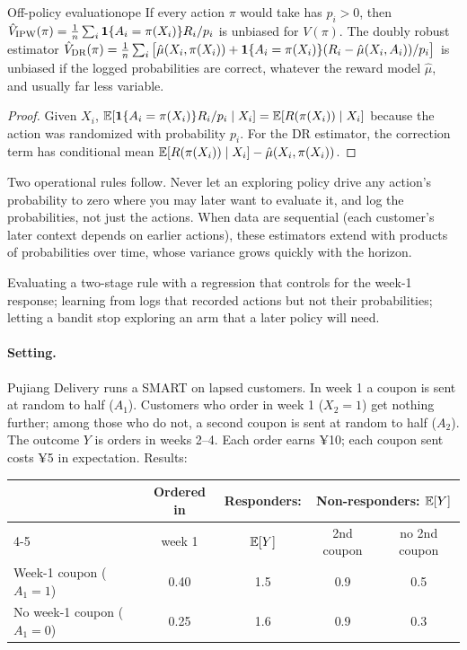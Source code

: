 \documentclass[11pt]{article}
\begin{document}
\begin{prop}{Off-policy evaluation}{ope}
If every action $\pi$ would take has $p_i > 0$, then $\hat V_{\text{IPW}}(\pi) = \frac1n\sum_i \mathbf{1}\{A_i = \pi(X_i)\}R_i/p_i$ is unbiased for
$V(\pi)$. The doubly robust estimator
$\hat V_{\text{DR}}(\pi) = \frac1n\sum_i\big[\hat\mu(X_i, \pi(X_i)) + \mathbf{1}\{A_i = \pi(X_i)\}(R_i - \hat\mu(X_i, A_i))/p_i\big]$ is unbiased if the logged
probabilities are correct, whatever the reward model $\hat\mu$, and usually far less variable.
\end{prop}
\begin{proof}
Given $X_i$, $\mathbb{E}[\mathbf{1}\{A_i = \pi(X_i)\}R_i/p_i \mid X_i] = \mathbb{E}[R(\pi(X_i)) \mid X_i]$ because the action was randomized with probability
$p_i$. For the DR estimator, the correction term has conditional mean $\mathbb{E}[R(\pi(X_i)) \mid X_i] - \hat\mu(X_i, \pi(X_i))$.
\end{proof}

Two operational rules follow. Never let an exploring policy drive any action's probability to zero where you may later want
to evaluate it, and log the probabilities, not just the actions. When data are sequential (each customer's later context
depends on earlier actions), these estimators extend with products of probabilities over time, whose variance grows quickly
with the horizon.

\begin{pitfall}
Evaluating a two-stage rule with a regression that controls for the week-1 response; learning from logs that recorded
actions but not their probabilities; letting a bandit stop exploring an arm that a later policy will need.
\end{pitfall}

\sectiontwo

\paragraph{Setting.} Pujiang Delivery runs a SMART on lapsed customers. In week 1 a coupon is sent at random to half ($A_1$). Customers
who order in week 1 ($X_2 = 1$) get nothing further; among those who do not, a second coupon is sent at random to half ($A_2$).
The outcome $Y$ is orders in weeks 2--4. Each order earns ¥10; each coupon sent costs ¥5 in expectation. Results:
\begin{center}
\begin{tabular}{lcccc}
\toprule
& Ordered in & Responders: & \multicolumn{2}{c}{Non-responders: $\mathbb{E}[Y]$} \\
\cmidrule(lr){4-5}
& week 1 & $\mathbb{E}[Y]$ & 2nd coupon & no 2nd coupon \\
\midrule
Week-1 coupon ($A_1 = 1$) & 0.40 & 1.5 & 0.9 & 0.5 \\
No week-1 coupon ($A_1 = 0$) & 0.25 & 1.6 & 0.9 & 0.3 \\
\bottomrule
\end{tabular}
\end{center}
\end{document}
